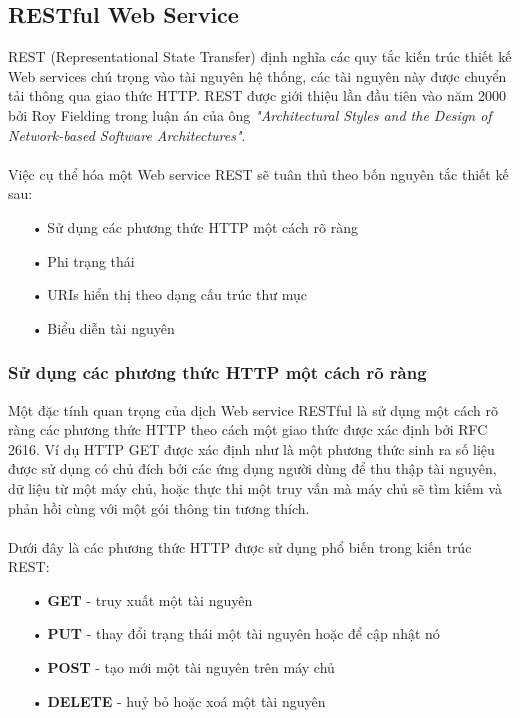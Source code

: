 \documentclass[a4paper]{article}
\begin{document}
\subsection{RESTful Web Service}
REST (Representational State Transfer) định nghĩa các quy tắc kiến trúc thiết kế Web services chú trọng vào tài nguyên hệ thống, các tài nguyên này được chuyển tải thông qua giao thức HTTP. REST được giới thiệu lần đầu tiên vào năm 2000 bởi Roy Fielding trong luận án của ông \textit{"Architectural Styles and the Design of Network-based Software Architectures"}.\\
\\
Việc cụ thể hóa một Web service REST sẽ tuân thủ theo bốn nguyên tắc thiết kế sau:
 \begin{itemize}
 	\item[•]Sử dụng các phương thức HTTP một cách rõ ràng
	\item[•]Phi trạng thái
	\item[•]URIs hiển thị theo dạng cấu trúc thư mục
	\item[•]Biểu diễn tài nguyên 
 \end{itemize}
\subsubsection{Sử dụng các phương thức HTTP một cách rõ ràng}
Một đặc tính quan trọng của dịch Web service RESTful là sử dụng một cách rõ ràng các phương thức HTTP theo cách một giao thức được xác định bởi RFC 2616. Ví dụ HTTP GET được xác định như là một phương thức sinh ra số liệu được sử dụng có chủ đích bởi các ứng dụng người dùng để thu thập tài nguyên, dữ liệu từ một máy chủ, hoặc thực thi một truy vấn mà máy chủ sẽ tìm kiếm và phản hồi cùng với một gói thông tin tương thích.\\
\\
Dưới đây là các phương thức HTTP được sử dụng phổ biến trong kiến trúc REST:
\begin{itemize}
\item[•]\textbf{GET} - truy xuất một tài nguyên 
\item[•]\textbf{PUT} - thay đổi trạng thái một tài nguyên hoặc để cập nhật nó
\item[•]\textbf{POST} - tạo mới một tài nguyên trên máy chủ
\item[•]\textbf{DELETE} - huỷ bỏ hoặc xoá một tài nguyên
\end{itemize}
\end{document}
